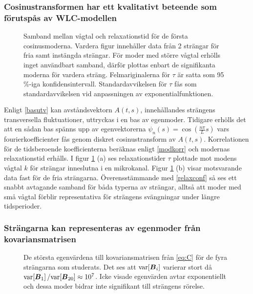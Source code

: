 \subsubsection{Cosinustransformen har ett kvalitativt beteende som förutspås av WLC-modellen}

\begin{figure}
    \centerline{
    \subfigure[][]{
    \label{fig:cosconf}
    }
    \subfigure[][]{
    \label{fig:cosnonconf}
    }}
    \caption{Samband mellan vågtal och relaxationstid för de första cosinusmoderna. Vardera figur innehåller data från 2 strängar för fria samt instängda strängar. För moder med större vågtal erhölls inget användbart samband, därför plottas enbart de signifikanta moderna för vardera sträng. Felmariginalerna för $\tau$ är satta som 95\,\%-iga konfidensintervall. Standardavvikelsen för $\tau$ fås som standardavvikelsen vid anpassningen av exponentialfunktionen.}
    \label{fig:cosmoder}
\end{figure}

Enligt \eqref{basutv} kan avståndsvektorn $A(t,s)$, innehållandes strängens transversella 
fluktuationer, uttryckas i en bas av egenmoder. Tidigare erhölls det att en sådan bas spänns upp av egenvektorerna $\psi_{n}(s)=\cos({\frac{n\pi}{L}s})$ vars fourierkoefficienter fås genom diskret cosinustransform av $A(t,s)$. Korrelationen för de tidsberoende koefficienterna beräknas enligt \eqref{modkorr} och modernas relaxationstid erhålls. I figur \ref{fig:cosmoder} (a) ses relaxationstider $\tau$ plottade mot modens vågtal $k$ för strängar inneslutna i en mikrokanal. Figur \ref{fig:cosmoder} (b) visar motsvarande data fast för de fria strängarna. Överensstämmande med \eqref{relaxconf} så ses ett snabbt avtagande samband för båda typerna av strängar, alltså att moder med små vågtal förblir representativa för strängens svängningar under längre tidsperioder.




\subsubsection{Strängarna kan representeras av egenmoder från kovariansmatrisen}

\begin{figure}
    \centering
    
    \caption{De största egenvärdena till kovariansmatrisen från \eqref{eq:C} för de fyra strängarna som studerats. Det ses att $\text{var}\!\left[\boldsymbol{B}_i\right]$ varierar stort då $\text{var}\!\left[\boldsymbol{B}_1\right]/\text{var}\!\left[\boldsymbol{B}_{20}\right]\approx10^7$. Icke visade egenvärden avtar exponentiellt och dessa moder bidrar inte signifikant till strängens rörelse.}
    \label{fig:kovegenvarde}
\end{figure}


